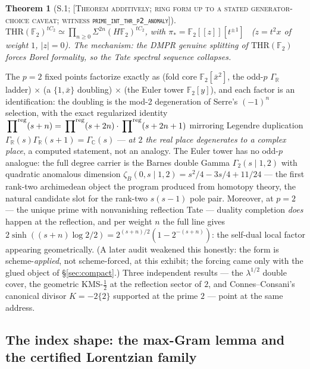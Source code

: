 \documentclass[11pt,reqno]{amsart}
\theoremstyle{plain}
\newtheorem{theorem}{Theorem}[section]
\theoremstyle{definition}
\theoremstyle{remark}
\newcommand{\R}{\mathbb{R}}
\newcommand{\C}{\mathbb{C}}
\newcommand{\F}{\mathbb{F}}
\newcommand{\THR}{\mathrm{THR}}
\newcommand{\prodreg}{\sideset{}{^{\mathrm{reg}}}\prod}
\newcommand{\grade}[1]{\textup{[\textsc{#1}]}}
\begin{document}
\begin{theorem}[S.1; \grade{Theorem additively; ring form up to a stated generator-choice
caveat; witness \texttt{prime\_\allowbreak int\_\allowbreak thr\_\allowbreak p2\_\allowbreak anomaly}}]\label{thm:s1}
$\THR(\F_2)^{tC_2} \simeq \prod_{n \ge 0} \Sigma^{2n} (H\F_2)^{tC_2}$, with
$\pi_* = \F_2[[z]][t^{\pm 1}]$ \ ($z = t^2 x$ of weight $1$, $|z| = 0$). The mechanism:
the DMPR genuine splitting of $\THR(\F_2)$ forces Borel formality, so the Tate spectral
sequence collapses.
\end{theorem}

The $p = 2$ fixed points factorize exactly as (fold core $\F_2[\bar{x}^2]$, the odd-$p$
$\Gamma_\R$ ladder) $\times$ (a $\{1, \bar x\}$ doubling) $\times$ (the Euler tower
$\F_2[y]$), and each factor is an identification: the doubling is the mod-2 degeneration of
Serre's $(-1)^n$ selection, with the exact regularized identity
$\prodreg(s+n) = \prodreg(s+2n)\cdot\prodreg(s+2n+1)$ mirroring Legendre duplication
$\Gamma_\R(s)\Gamma_\R(s+1) = \Gamma_\C(s)$ --- \emph{at $2$ the real place degenerates to a
complex place}, a computed statement, not an analogy. The Euler tower has no odd-$p$
analogue: the full degree carrier is the Barnes double Gamma $\Gamma_2(s \mid 1, 2)$ with
quadratic anomalous dimension $\zeta_B(0, s \mid 1,2) = s^2/4 - 3s/4 + 11/24$ --- the first
rank-two archimedean object the program produced from homotopy theory, the natural candidate
slot for the rank-two $s(s-1)$ pole pair. Moreover, at $p = 2$ --- the unique prime with
nonvanishing reflection Tate --- duality completion \emph{does} happen at the reflection,
and per weight $n$ the full line gives $2\sinh((s+n)\log 2/2) = 2^{(s+n)/2}(1 - 2^{-(s+n)})$:
the self-dual local factor appearing geometrically. (A later audit weakened this honestly:
the form is scheme-\emph{applied}, not scheme-forced, at this exhibit; the forcing came only
with the glued object of \S\ref{sec:compact}.) Three independent results --- the
$\lambda^{1/2}$ double cover, the geometric KMS-$\tfrac12$ at the reflection sector of $2$,
and Connes--Consani's canonical divisor $K = -2\{2\}$ supported at the prime $2$
\cite{CCRR22} --- point at the same address.

\subsection{The index shape: the max-Gram lemma and the certified Lorentzian family}
\label{subsec:maxgram}
\end{document}
